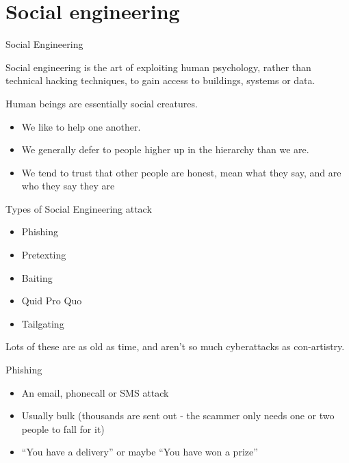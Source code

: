 \documentclass[xcolor=table]{beamer}
\begin{document}
\section{Social engineering }

\begin{frame}{Social Engineering}

Social engineering is the art of exploiting human psychology,
rather than technical hacking techniques, to gain access to
buildings, systems or data.

Human beings are essentially social creatures.

	\begin{itemize}
		\item We like to help one another.
		\item We generally defer to people higher up in the hierarchy than we are.  
		\item We tend to trust that other people are honest, mean what they say, and are who they say they are
	\end{itemize}
\end{frame}

\begin{frame}{Types of Social Engineering attack}
	\begin{itemize}
		\item Phishing
		\item Pretexting
		\item Baiting
		\item Quid Pro Quo
		\item Tailgating
	\end{itemize}
	Lots of these are as old as time, and aren't so much cyberattacks as con-artistry.
\end{frame}

\begin{frame}{Phishing}
	\begin{itemize}
		\item An email, phonecall or SMS attack
		\item Usually bulk (thousands are sent out - the scammer only needs one or two people to fall for it)
		\item ``You have a delivery'' or maybe ``You have won a prize''
	\end{itemize}
\end{frame}
\end{document}
